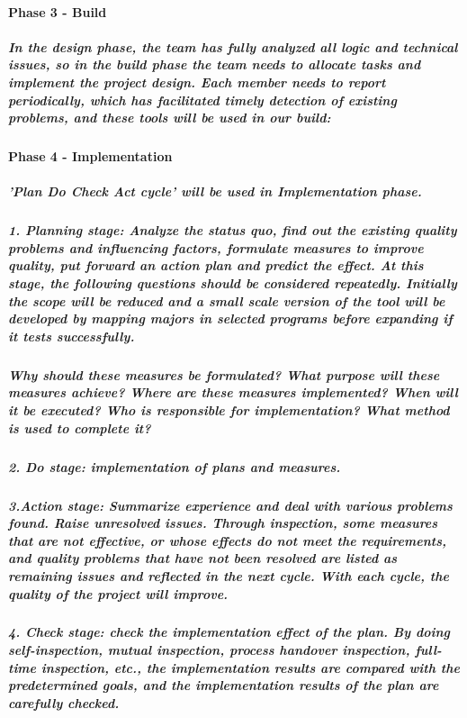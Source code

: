 \documentclass[12pt]{article}
\begin{document}
\paragraph{Phase 3 - Build} 

\subparagraph{In the design phase, the team has fully analyzed all logic and technical issues, so in the build phase the team needs to allocate tasks and implement the project design.  Each member needs to report periodically, which has facilitated timely detection of existing problems, and these tools will be used in our build:}

\paragraph{Phase 4 - Implementation}

\subparagraph{'Plan Do Check Act cycle' will be used in Implementation phase.}

\subparagraph{1. Planning stage: Analyze the status quo, find out the existing quality problems and influencing factors, formulate measures to improve quality, put forward an action plan and predict the effect. At this stage, the following questions should be considered repeatedly. Initially the scope will be reduced and a small scale version of the tool will be developed by mapping majors in selected programs before expanding if it tests successfully.}

\subparagraph{Why should these measures be formulated? What purpose will these measures achieve? Where are these measures implemented? When will it be executed? Who is responsible for implementation? What method is used to complete it?}


\subparagraph{2. Do stage: implementation of plans and measures.}

\subparagraph{3.Action stage: Summarize experience and deal with various problems found. Raise unresolved issues. Through inspection, some measures that are not effective, or whose effects do not meet the requirements, and quality problems that have not been resolved are listed as remaining issues and reflected in the next cycle.
With each cycle, the quality of the project will improve. }

\subparagraph{4. Check stage: check the implementation effect of the plan. By doing self-inspection, mutual inspection, process handover inspection, full-time inspection, etc., the implementation results are compared with the predetermined goals, and the implementation results of the plan are carefully checked.}
\newpage
\end{document}
